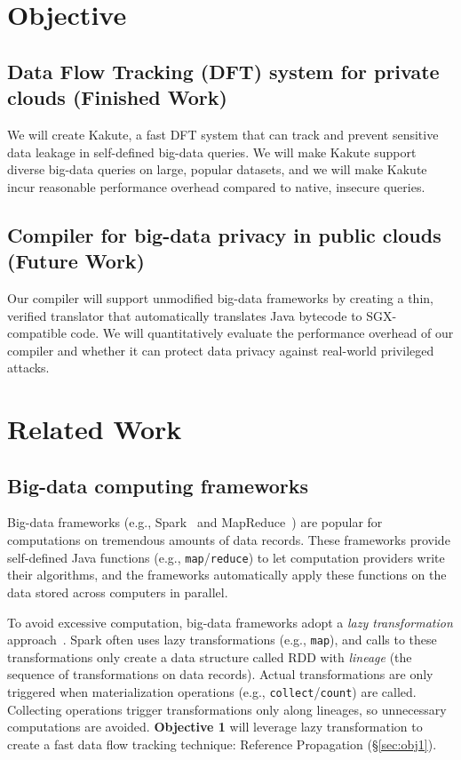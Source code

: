 \documentclass{article}
\let\vv\texttt
\newcommand{\lazyp}[0]{Reference Propagation\xspace}
\newcommand{\func}[1]{\textsc{#1}}
\newcommand{\eg}{{e.g.}}
\begin{document}
\section{Objective}
\subsection{Data Flow Tracking (DFT) system for private clouds (Finished Work)} 
We will create Kakute, a fast DFT system that can track and prevent sensitive data
leakage in self-defined big-data queries. We will make Kakute support diverse
big-data queries on large, popular datasets, and we will make Kakute incur
reasonable performance overhead compared to native, insecure queries.

\subsection{Compiler for big-data privacy in public clouds (Future Work)} 
Our compiler will support unmodified big-data frameworks by creating a thin,
verified translator that automatically translates Java bytecode to
SGX-compatible code. We will quantitatively evaluate the performance overhead of
our compiler and whether it can protect data privacy against real-world
privileged attacks.

\section{Related Work}
\subsection{Big-data computing frameworks} 
\label{sec:bigdata}\vspace{-.075in}

Big-data frameworks (\eg, Spark~\cite{nsdi12:spark} and 
MapReduce~\cite{hadoop}) are popular for computations on tremendous amounts 
of data records. These frameworks provide self-defined Java functions (\eg, 
\vv{map}/\vv{reduce}) to let computation providers write their algorithms, 
and the frameworks automatically apply these functions on the data stored 
across computers in parallel.

To avoid excessive computation, big-data frameworks adopt a \emph{lazy 
transformation} approach~\cite{pig:vldb08,nsdi12:spark}. Spark 
often uses lazy transformations (\eg, \vv{map}), and calls to 
these transformations only create a data structure called \func{RDD} with 
\emph{lineage} (the sequence of transformations on data records).
Actual transformations are only triggered when materialization 
operations (\eg, \vv{collect}/\vv{count}) are called. Collecting 
operations trigger transformations only along lineages, so unnecessary 
computations are avoided. \textbf{Objective 1} will leverage lazy 
transformation to create a fast data flow tracking technique: \lazyp 
(\S\ref{sec:obj1}).
\end{document}

